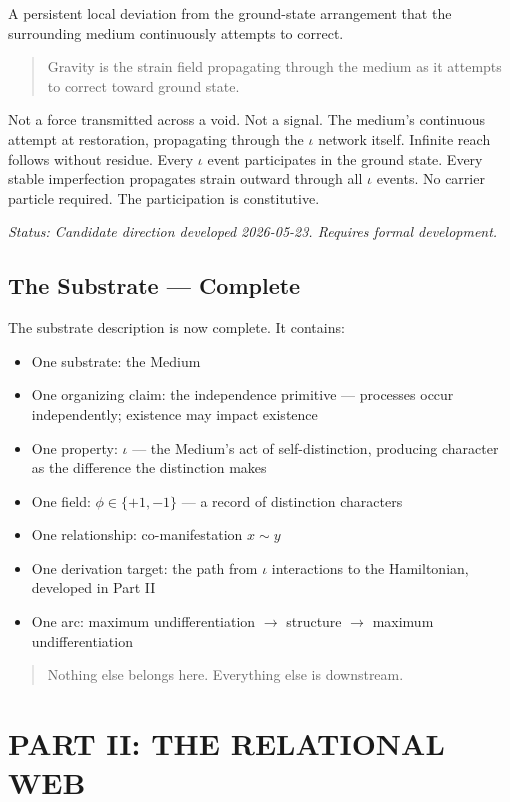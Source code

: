 \documentclass[11pt,letterpaper]{article}
\begin{document}
A persistent local deviation from the ground-state arrangement that the surrounding medium continuously attempts to correct.

\begin{quote}
Gravity is the strain field propagating through the medium as it attempts to correct toward ground state.
\end{quote}

Not a force transmitted across a void. Not a signal. The medium's continuous attempt at restoration, propagating through the \(\iota\) network itself. Infinite reach follows without residue. Every \(\iota\) event participates in the ground state. Every stable imperfection propagates strain outward through all \(\iota\) events. No carrier particle required. The participation is constitutive.

\emph{Status: Candidate direction developed 2026-05-23. Requires formal development.}

\subsection{The Substrate --- Complete}
\label{sec:orgc9b5256}

The substrate description is now complete. It contains:

\begin{itemize}
\item One substrate: the Medium
\item One organizing claim: the independence primitive --- processes occur independently; existence may impact existence
\item One property: \(\iota\) --- the Medium's act of self-distinction, producing character as the difference the distinction makes
\item One field: \(\phi \in \{+1, -1\}\) --- a record of distinction characters
\item One relationship: co-manifestation \(x \sim y\)
\item One derivation target: the path from \(\iota\) interactions to the Hamiltonian, developed in Part II
\item One arc: maximum undifferentiation \(\to\) structure \(\to\) maximum undifferentiation
\end{itemize}

\begin{quote}
Nothing else belongs here. Everything else is downstream.
\end{quote}


\section{PART II: THE RELATIONAL WEB}
\label{sec:org7e07107}
\end{document}
